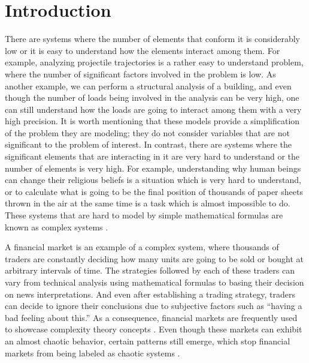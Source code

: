 \chapter{Introduction}
\label{chapter:introduction}

There are systems where the number of elements that conform it is considerably
low or it is easy to understand how the elements interact among them. For
example, analyzing projectile trajectories is a rather easy to understand
problem, where the number of significant factors involved in the problem is
low. As another example, we can perform a structural analysis of a building, and
even though the number of loads being involved in the analysis can be very high,
one can still understand how the loads are going to interact among them with a
very high precision. It is worth mentioning that these models provide a
simplification of the problem they are modeling; they do not consider variables
that are not significant to the problem of interest. In contrast, there are
systems where the significant elements that are interacting in it are very hard
to understand or the number of elements is very high. For example, understanding
why human beings can change their religious beliefs is a situation which is very
hard to understand, or to calculate what is going to be the final position of
thousands of paper sheets thrown in the air at the same time is a task which is
almost impossible to do. These systems that are hard to model by simple
mathematical formulas are known as complex systems \cite{Anderson1999}. %

A financial market is an example of a complex system, where thousands of traders
are constantly deciding how many units are going to be sold or bought at
arbitrary intervals of time. The strategies followed by each of these traders
can vary from technical analysis using mathematical formulas to basing their
decision on news interpretations. And even after establishing a trading
strategy, traders can decide to ignore their conclusions due to subjective
factors such as ``having a bad feeling about this.'' As a consequence, financial
markets are frequently used to showcase complexity theory concepts
\cite{Arthur1999} \cite{Bundesbank2007}. Even though these markets can exhibit an
almost chaotic behavior, certain patterns still emerge, which stop financial
markets from being labeled as chaotic systems \cite{Castillo2001}.

